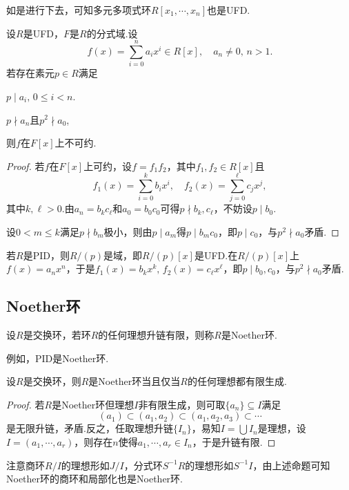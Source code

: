 如是进行下去，可知多元多项式环$R[x_1,\cdots,x_n]$也是UFD.
\begin{prop}[(Eisenstein)]
    设$R$是UFD，$F$是$R$的分式域.设
    \[
        f(x)=\sum_{i=0}^na_ix^i\in R[x],\quad a_n\ne 0,\,n>1.
    \]
    若存在素元$p\in R$满足
    \begin{enumerate*}
        \item $p\mid a_i,\,0\le i<n$.
        \item $p\nmid a_n$且$p^2\nmid a_0$,
    \end{enumerate*}
    则$f$在$F[x]$上不可约.
\end{prop}
\begin{proof}
    若$f$在$F[x]$上可约，设$f=f_1f_2$，其中$f_1,f_2\in R[x]$且
    \[
        f_1(x)=\sum_{i=0}^kb_ix^i,\quad f_2(x)=\sum_{j=0}^\ell c_jx^j,
    \]
    其中$k,\ell>0$.由$a_n=b_kc_\ell$和$a_0=b_0c_0$可得$p\nmid b_k,c_\ell$，不妨设$p\mid b_0$.

    设$0<m\le k$满足$p\nmid b_m$极小，则由$p\mid a_m$得$p\mid b_mc_0$，即$p\mid c_0$，与$p^2\nmid a_0$矛盾.
\end{proof}
\begin{remark}
    若$R$是PID，则$R/(p)$是域，即$R/(p)[x]$是UFD.在$R/(p)[x]$上$f(x)=a_nx^n$，于是$f_1(x)=b_kx^k,\,f_2(x)=c_\ell x^\ell$，即$p\mid b_0,c_0$，与$p^2\nmid a_0$矛盾.
\end{remark}

\subsection{Noether环}
\begin{definition}
    设$R$是交换环，若环$R$的任何理想升链有限，则称$R$是{\heiti Noether环}.
\end{definition}

例如，PID是Noether环.
\begin{prop}
    设$R$是交换环，则$R$是Noether环当且仅当$R$的任何理想都有限生成.
\end{prop}
\begin{proof}
    若$R$是Noether环但理想$I$非有限生成，则可取$\{a_n\}\subseteq I$满足
    \[
        (a_1)\subset(a_1,a_2)\subset(a_1,a_2,a_3)\subset\cdots
    \]
    是无限升链，矛盾.反之，任取理想升链$\{I_n\}$，易知$I=\bigcup I_n$是理想，设$I=(a_1,\cdots,a_r)$，则存在$n$使得$a_1,\cdots,a_r\in I_n$，于是升链有限.
\end{proof}

注意商环$R/I$的理想形如$J/I$，分式环$S^{-1}R$的理想形如$S^{-1}I$，由上述命题可知Noether环的商环和局部化也是Noether环.

